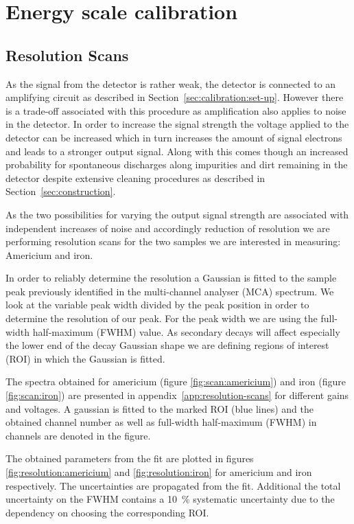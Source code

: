\section{Energy scale calibration}

\subsection{Resolution Scans}
\label{sec:resolution_scans}
As the signal from the detector is rather weak, the detector is connected to an
amplifying circuit as described in Section~\ref{sec:calibration:set-up}. However
there is a trade-off associated with this procedure as amplification also
applies to noise in the detector. In order to increase the signal strength the
voltage applied to the detector can be increased which in turn increases the
amount of signal electrons and leads to a stronger output signal. Along with
this comes though an increased probability for spontaneous discharges along
impurities and dirt remaining in the detector despite extensive cleaning
procedures as described in Section~\ref{sec:construction}.

As the two possibilities for varying the output signal strength are associated
with independent increases of noise and accordingly reduction of resolution we
are performing resolution scans for the two samples we are interested in
measuring: Americium and iron.

In order to reliably determine the resolution a Gaussian is fitted to the sample
peak previously identified in the multi-channel analyser (MCA) spectrum. We look
at the variable peak width divided by the peak position in order to determine
the resolution of our peak. For the peak width we are using the full-width
half-maximum (FWHM) value. As secondary decays will affect especially the lower
end of the decay Gaussian  shape we are defining regions of interest (ROI) in which the Gaussian
is fitted.

The spectra obtained for americium (figure \ref{fig:scan:americium}) and iron
(figure \ref{fig:scan:iron}) are presented in appendix~\ref{app:resolution-scans} for different gains and voltages.
A gaussian is fitted to the marked ROI (blue lines) and the obtained channel number as well as
full-width half-maximum (FWHM) in channels are denoted in the figure.

The obtained parameters from the fit are plotted in figures
\ref{fig:resolution:americium} and \ref{fig:resolution:iron} for americium and
iron respectively. The uncertainties are propagated from the fit. Additional the
total uncertainty on the FWHM contains a \SI{10}{\percent} systematic
uncertainty due to the dependency on choosing the corresponding ROI.

